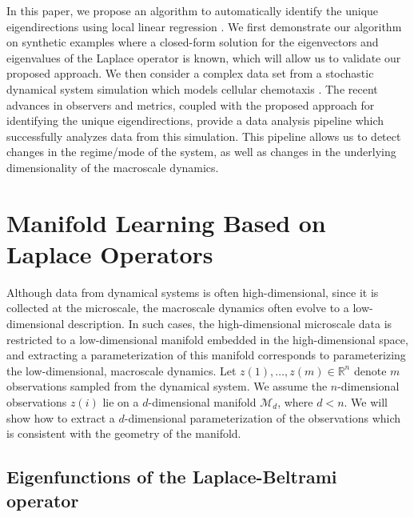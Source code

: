 \documentclass[3p]{elsarticle}
\begin{document}
In this paper, we propose an algorithm to automatically identify the unique eigendirections using local linear regression \cite{wasserman2006all}.
%
We first demonstrate our algorithm on synthetic examples where a closed-form solution for the eigenvectors and eigenvalues of the Laplace operator is known, which will allow us to validate our proposed approach.
%
We then consider a complex data set from a stochastic dynamical system simulation which models cellular chemotaxis \cite{othmer1988models}. 
%
The recent advances in observers and metrics, coupled with the proposed approach for identifying the unique eigendirections, provide a data analysis pipeline which successfully analyzes data from this simulation.
%
This pipeline allows us to detect changes in the regime/mode of the system, as well as changes in the underlying dimensionality of the macroscale dynamics.  


\section{Manifold Learning Based on Laplace Operators}

Although data from dynamical systems is often high-dimensional, since it is collected at the microscale, the macroscale dynamics often evolve to a low-dimensional description. 
%
In such cases, the high-dimensional microscale data is restricted to a low-dimensional manifold embedded in the high-dimensional space, and extracting a parameterization of this manifold corresponds to parameterizing the low-dimensional, macroscale dynamics.
%
Let $z(1), \dots, z(m) \in \mathbb{R}^n$ denote $m$ observations sampled from the dynamical system. 
%
We assume the $n$-dimensional observations $z(i)$ lie on a $d$-dimensional manifold $\mathcal{M}_d$, where $d < n$. 
%
We will show how to extract a $d$-dimensional parameterization of the observations which is consistent with the geometry of the manifold. 

\subsection{Eigenfunctions of the Laplace-Beltrami operator}
\end{document}
